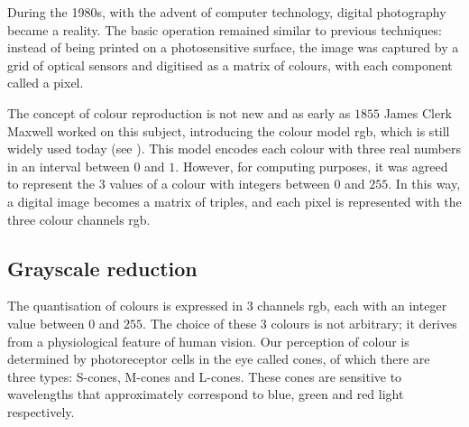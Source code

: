 \noindent During the 1980s, with the advent of computer technology, digital photography became a reality. The basic operation remained similar to previous techniques: instead of being printed on a photosensitive surface, the image was captured by a grid of optical sensors and digitised as a matrix of colours, with each component called a pixel.

\noindent The concept of colour reproduction is not new and as early as $1855$ James Clerk Maxwell worked on this subject, introducing the colour model \gls{rgb}, which is still widely used today (see \cite{MaxWell_Colours}). This model encodes each colour with three real numbers in an interval between $0$ and $1$. However, for computing purposes, it was agreed to represent the $3$ values of a colour with integers between $0$ and $255$. In this way, a digital image becomes a matrix of triples, and each pixel is represented with the three colour channels \gls{rgb}.

\subsection{Grayscale reduction}
The quantisation of colours is expressed in $3$ channels \gls{rgb}, each with an integer value between $0$ and $255$. The choice of these $3$ colours is not arbitrary; it derives from a physiological feature of human vision. Our perception of colour is determined by photoreceptor cells in the eye called cones, of which there are three types: S-cones, M-cones and L-cones. These cones are sensitive to wavelengths that approximately correspond to blue, green and red light respectively.

